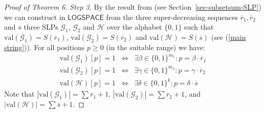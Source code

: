 \documentclass[10pt,a4paper]{article}
\newcommand{\val}{\mathrm{val}}
\renewcommand{\L}{\ensuremath{\mathsf{LOGSPACE}}\xspace}
\begin{document}
\begin{proof}[Proof of Theorem 6]
\medskip
\noindent
{\em Step 3.} 
By the result from \cite{ref35} (see Section~\ref{sec-subsetsum-SLP})
we can construct in \L from the three super-decreasing sequences
$\overline{r}_1, \overline{r}_2$ and $\overline{s}$ three SLPs $\mathcal{G}_1$,   $\mathcal{G}_2$ and $\mathcal{H}$ over the alphabet
$\{0,1\}$ such that $\val(\mathcal{G}_1) = S(\overline{r}_1)$, $\val(\mathcal{G}_2) = S(\overline{r}_2)$
and $\val(\mathcal{H}) = S(\overline{s})$ (see (\ref{main string})).
For all positions $p \geq 0$ (in the suitable range) we have:
\begin{eqnarray*}
\val(\mathcal{G}_1)[p] = 1  & \Longleftrightarrow & 
\exists \beta \in  \{0,1\}^{m_1}: 
p = \beta \cdot \overline{r}_1 \\ 
\val(\mathcal{G}_2)[p] = 1  & \Longleftrightarrow & 
\exists  \gamma \in  \{0,1\}^{m_2}: 
p = \gamma \cdot \overline{r}_2 \\ 
\val(\mathcal{H})[p] = 1  & \Longleftrightarrow & 
\exists \delta \in  \{0,1\}^k: 
p = \delta \cdot \overline{s}
\end{eqnarray*}
Note that $|\val(\mathcal{G}_1)| = \sum\overline{r}_1+1$, $|\val(\mathcal{G}_2)| = \sum\overline{r}_2+1$, and
$|\val(\mathcal{H})| = \sum\overline{s}+1$.



\end{proof}
\end{document}
